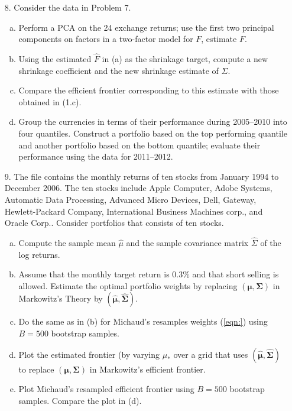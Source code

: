 \begin{enumerate}
    
\item[8.] Consider the data in Problem 7.
	\begin{enumerate}[(a)]
	\item Perform a PCA on the 24 exchange returns; use the first two principal components on factors in a two-factor model for $F$, estimate $F$.
	\item Using the estimated $\hat{F}$ in (a) as the shrinkage target, compute a new shrinkage coefficient and the new shrinkage estimate of $\Sigma$. 
	\item Compare the efficient frontier corresponding to this estimate with those obtained in (1.c). 
	\item Group the currencies in terms of their performance during 2005--2010 into four quantiles. Construct a portfolio based on the top performing quantile and another portfolio based on the bottom quantile; evaluate their performance using the data for 2011--2012.
	\end{enumerate}



\item[9.] The file  contains the monthly returns of ten stocks from January 1994 to December 2006. The ten stocks include Apple Computer, Adobe Systems, Automatic Data Processing, Advanced Micro Devices, Dell, Gateway, Hewlett-Packard Company, International Business Machines corp., and Oracle Corp.. Consider portfolios that consists of ten stocks.
	\begin{enumerate}[(a)]
	\item Compute the sample mean $\hat{\mu}$ and the sample covariance matrix $\hat{\Sigma}$ of the log returns. 
	\item Assume that the monthly target return is 0.3\% and that short selling is allowed. Estimate the optimal portfolio weights by replacing $(\mathbf{\mu},\mathbf{\Sigma})$ in Markowitz's Theory by $(\hat{\mathbf{\mu}}, \hat{\mathbf{\Sigma}})$. 
	\item Do the same as in (b) for Michaud's resamples weights (\ref{eqn:}) using $B=500$ bootstrap samples.
	\item Plot the estimated frontier (by varying $\mu_*$ over a grid that uses $(\hat{\mathbf{\mu}},\hat{\mathbf{\Sigma}})$ to replace $(\mathbf{\mu},\mathbf{\Sigma})$ in Markowitz's efficient frontier.
	\item Plot Michaud's resampled efficient frontier using $B=500$ bootstrap samples. Compare the plot in (d). 
	\end{enumerate}




\end{enumerate}
